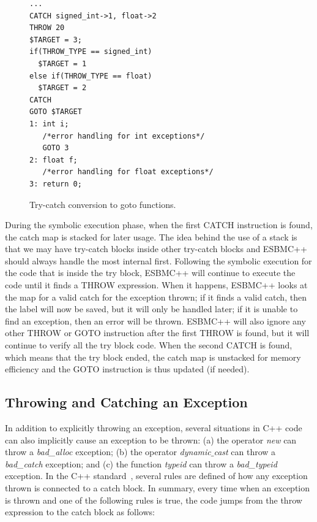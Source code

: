 \documentclass[conference]{IEEEtran}
\begin{document}
\begin{figure}[ht]
\centering
\begin{minipage}{0.45\textwidth}
\begin{lstlisting}
...
CATCH signed_int->1, float->2
THROW 20
$TARGET = 3;
if(THROW_TYPE == signed_int)
  $TARGET = 1
else if(THROW_TYPE == float)
  $TARGET = 2
CATCH
GOTO $TARGET
1: int i;
   /*error handling for int exceptions*/
   GOTO 3
2: float f;
   /*error handling for float exceptions*/
3: return 0;
\end{lstlisting}
\end{minipage}
\caption{Try-catch conversion to goto functions.}
\label{figure:try-catch-goto}
\end{figure}

During the symbolic execution phase, when the first
CATCH instruction is found, the catch map is stacked
for later usage. The idea behind the use of a stack is
that we may have try-catch blocks inside other
try-catch blocks and ESBMC++ should always handle
the most internal first. Following the symbolic execution
for the code that is inside the try block, ESBMC++ will continue
to execute the code until it finds a THROW expression.
When it happens, ESBMC++ looks at the map for a valid catch
for the exception thrown; if it finds a valid catch, then the label
will now be saved, but it will only be handled later;
if it is unable to find an exception, then an error will be thrown.
ESBMC++ will also ignore any other THROW or GOTO
instruction after the first THROW is found, but it will continue
to verify all the try block code. When the second CATCH is found,
which means that the try block ended, the catch map is unstacked for
 memory efficiency and the GOTO instruction is thus updated (if needed).

\subsection{Throwing and Catching an Exception}

In addition to explicitly throwing an exception, several situations in
C++ code can also implicitly cause an exception to be thrown:
(a) the operator \textit{new} can throw
a \textit{bad\_alloc} exception; (b) the operator
\textit{dynamic$\_$cast} can throw a \textit{bad\_catch}
exception; and (c) the function \textit{typeid} can throw a
\textit{bad\_typeid} exception.
In the C++ standard~\cite{CppDraft},
several rules are defined of how any exception
thrown is connected to a catch block.
In summary, every time when an exception is thrown and
one of the following rules is {true}, the code jumps
from the throw expression to the catch block as follows:
\end{document}
